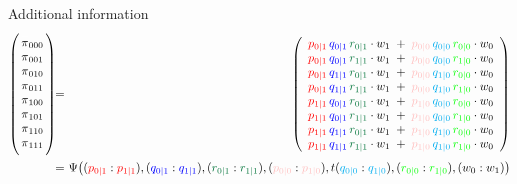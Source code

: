 \begin{frame}{\vskip -0.2cm \LARGE Additional information}
\vskip -0.5cm
\begin{eqnarray*}
\left(\!\!\begin{array}{c}
\overset{{\color{white}+}}{\pi}_{000} \\
\overset{{\color{white}.}}{\pi}_{001} \\
\overset{{\color{white}.}}{\pi}_{010} \\
\overset{{\color{white}.}}{\pi}_{011} \\
\overset{{\color{white}.}}{\pi}_{100} \\
\overset{{\color{white}.}}{\pi}_{101} \\
\overset{{\color{white}.}}{\pi}_{110} \\
\underset{{\color{white}.}}{\overset{{\color{white}.}}{\pi}_{111}} \\
\end{array}\!\!\right)
& \!\! = \!\! &
\left(\begin{array}{c}
\pzo\,\qzo\,\rzo \cdot w_{1} \;+\; \pzz\,\qzz\,\rzz \cdot w_{0} \\
\pzo\,\qzo\,\roo \cdot w_{1} \;+\; \pzz\,\qzz\,\roz \cdot w_{0} \\
\pzo\,\qoo\,\rzo \cdot w_{1} \;+\; \pzz\,\qoz\,\rzz \cdot w_{0} \\
\pzo\,\qoo\,\roo \cdot w_{1} \;+\; \pzz\,\qoz\,\roz \cdot w_{0} \\
\poo\,\qzo\,\rzo \cdot w_{1} \;+\; \poz\,\qzz\,\rzz \cdot w_{0} \\
\poo\,\qzo\,\roo \cdot w_{1} \;+\; \poz\,\qzz\,\roz \cdot w_{0} \\
\poo\,\qoo\,\rzo \cdot w_{1} \;+\; \poz\,\qoz\,\rzz \cdot w_{0} \\
\poo\,\qoo\,\roo \cdot w_{1} \;+\; \poz\,\qoz\,\roz \cdot w_{0} \\
\end{array}\right)
\\
& \!\! =\!\! &
	\!\!\Psi\!\left(
		(\pzo:\poo),
		(\qzo:\qoo),
		(\rzo:\roo),
		(\pzz:\poz),
		t(\qzz:\qoz),
		(\rzz:\roz),
		\left(w_{0}:w_{1}\right)
	\right)
\end{eqnarray*}

\vskip -0.1cm



\end{frame}
